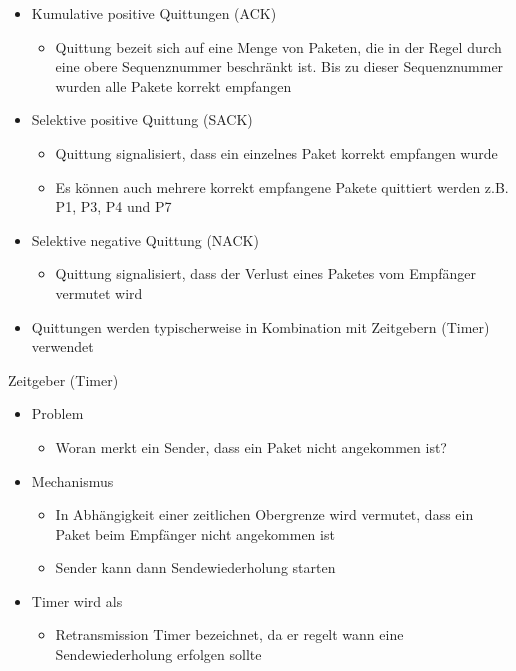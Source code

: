       \begin{itemize}
        \item Kumulative positive Quittungen (ACK)
          \begin{itemize}
            \item Quittung bezeit sich auf eine Menge von Paketen, die in der Regel durch eine obere
              Sequenznummer beschränkt ist. Bis zu dieser Sequenznummer wurden alle Pakete korrekt
              empfangen
          \end{itemize}
        \item Selektive positive Quittung (SACK)
          \begin{itemize}
            \item Quittung signalisiert, dass ein einzelnes Paket korrekt empfangen wurde
            \item Es können auch mehrere korrekt empfangene Pakete quittiert werden z.B. P1, P3, P4
              und P7
          \end{itemize}
        \item Selektive negative Quittung (NACK)
          \begin{itemize}
            \item Quittung signalisiert, dass der Verlust eines Paketes vom Empfänger vermutet wird
          \end{itemize}
        \item Quittungen werden typischerweise in Kombination mit Zeitgebern (Timer) verwendet
      \end{itemize}
      Zeitgeber (Timer)
      \begin{itemize}
        \item Problem
          \begin{itemize}
            \item Woran merkt ein Sender, dass ein Paket nicht angekommen ist?
          \end{itemize}
        \item Mechanismus
          \begin{itemize}
            \item In Abhängigkeit einer zeitlichen Obergrenze wird vermutet, dass ein Paket beim
              Empfänger nicht angekommen ist
            \item Sender kann dann Sendewiederholung starten
          \end{itemize}
        \item Timer wird als
          \begin{itemize}
            \item Retransmission Timer bezeichnet, da er regelt wann eine Sendewiederholung erfolgen
              sollte
          \end{itemize}
      \end{itemize}
